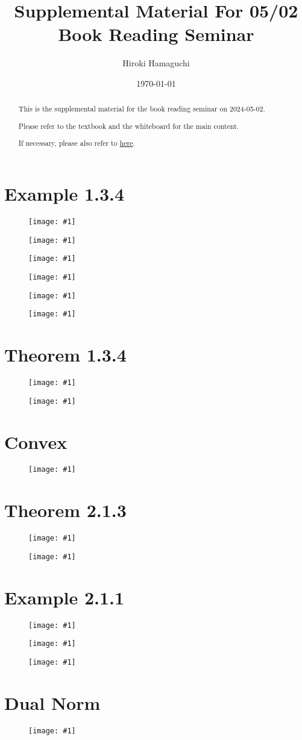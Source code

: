 \documentclass[a4paper, 10pt, dvipdfmx]{article}
\newcommand{\IMG}[2]{
    \begin{figure}[H]
        \centering
        \texttt{[image: \#1]}
        \caption{}
    \end{figure}
}
\begin{document}
\title{Supplemental Material For 05/02 Book Reading Seminar}
\author{Hiroki Hamaguchi}
\date{\today}
\maketitle

\begin{abstract}
    \begin{center}
        This is the supplemental material for the book reading seminar on 2024-05-02.

        Please refer to the textbook and the whiteboard for the main content.

        If necessary, please also refer to \href{https://github.com/hari64boli64/BookReadingSeminarOn20240502}{here}.
    \end{center}
\end{abstract}

\section*{Example 1.3.4}
\IMG{example1.3.4_f1.png}{0.6}
\IMG{example1.3.4_quadraticPenalty.png}{0.6}
\IMG{example1.3.4_nonSmoothPenalty.png}{0.6}
\IMG{example1.3.4_powerFunctionBarrier_withP2.png}{0.6}
\IMG{example1.3.4_logarithmicBarrier.png}{0.6}
\IMG{example1.3.4_exponentialBarrier.png}{0.6}

\section*{Theorem 1.3.4}
\IMG{theorem1.3.4_(x-2)^2.png}{0.6}
\IMG{theorem1.3.4_(x-8)^2.png}{0.6}

\section*{Convex}
\IMG{convex.png}{0.8}

\section*{Theorem 2.1.3}
\IMG{theorem2.1.3_1d.png}{0.8}
\IMG{theorem2.1.3_2d.png}{0.8}

\section*{Example 2.1.1}
\IMG{example2.1.1_2.png}{0.6}
\IMG{example2.1.1_3.png}{0.6}
\IMG{example2.1.1_3d.png}{0.7}

\section*{Dual Norm}
\IMG{dualNorm.png}{0.8}
\end{document}
